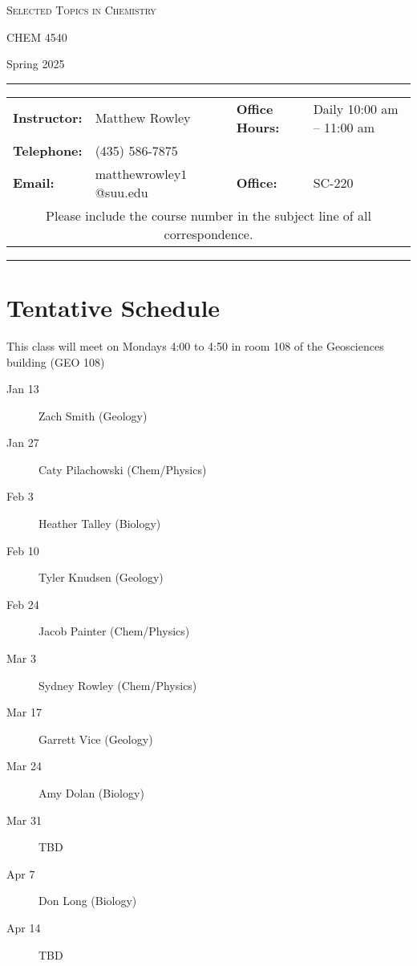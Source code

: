 \documentclass[12pt, letterpaper]{article}
\begin{document}
\begin{center}
{\Large \textsc{Selected Topics in Chemistry}}

CHEM 4540
\end{center}

\begin{center}
	{\large Spring 2025}
\end{center}
\begin{center}
	\rule{0.99\textwidth}{0.4pt}
	\begin{tabular}{llcll}
		\textbf{Instructor:} & Matthew Rowley           &  & \textbf{Office Hours:} & Daily 10:00 am -- 11:00 am \\
		\textbf{Telephone:}  & (435) 586-7875           &  &                        &  \\
		\textbf{Email:}      & matthewrowley$1$@suu.edu &  & \textbf{Office:}       & SC-220                   \\
		\multicolumn{5}{c}{Please include the course number in the subject line of all correspondence.}
	\end{tabular}
	\rule{0.99\textwidth}{0.4pt}
\end{center}

\section*{Tentative Schedule}
This class will meet on Mondays 4:00 to 4:50 in room 108 of the Geosciences building (GEO 108)

\begin{description}
  \item[Jan 13] Zach Smith (Geology)
  \item[Jan 27] Caty Pilachowski (Chem/Physics)
  \item[Feb 3] Heather Talley (Biology)
  \item[Feb 10] Tyler Knudsen (Geology)
  \item[Feb 24] Jacob Painter (Chem/Physics)
  \item[Mar 3] Sydney Rowley (Chem/Physics)
  \item[Mar 17] Garrett Vice (Geology)
  \item[Mar 24] Amy Dolan (Biology)
  \item[Mar 31] TBD
  \item[Apr 7] Don Long (Biology)
  \item[Apr 14] TBD
\end{description}
\end{document}
